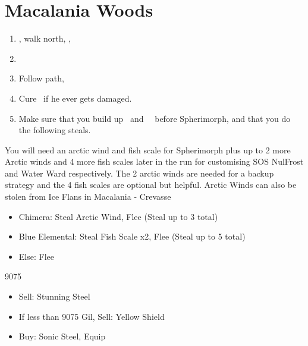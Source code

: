 \chapter{Macalania Woods}
\begin{enumerate}
	\item \sd, walk north, \sd, \save
	\item \formation{\tidus}{\rikku}{\auron}
	\item Follow path, 
	\item Cure \tidus\ if he ever gets damaged.
	\item Make sure that you build up \rikku\ and \yuna\ \od\ before Spherimorph, and that you do the following steals.
\end{enumerate}
\begin{encounters}
	You will need an arctic wind and fish scale for Spherimorph plus up to 2 more Arctic winds and 4 more fish scales later in the run for customising SOS NulFrost and Water Ward respectively. The 2 arctic winds are needed for a backup strategy and the 4 fish scales are optional but helpful. Arctic Winds can also be stolen from Ice Flans in Macalania - Crevasse
	\begin{itemize}
		\item Chimera: Steal Arctic Wind, Flee (Steal up to 3 total)
		\item Blue Elemental: Steal Fish Scale x2, Flee (Steal up to 5 total)
		\item Else: Flee
	\end{itemize}
\end{encounters}
\begin{shop}{9075}
	\begin{itemize}
		\item Sell: Stunning Steel
		\item If less than 9075 Gil, Sell: Yellow Shield
		\item Buy: Sonic Steel, Equip
	\end{itemize}
\end{shop}
